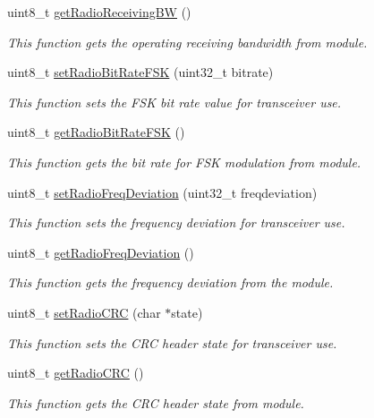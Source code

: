 \begin{DoxyCompactItemize}
uint8\+\_\+t \hyperlink{class_wasp_lo_ra_w_a_n_ada44238eb38e54b057f6659e7fc93c57}{get\+Radio\+Receiving\+BW} ()
\begin{DoxyCompactList}\small\item\em This function gets the operating receiving bandwidth from module. \end{DoxyCompactList}\item 
uint8\+\_\+t \hyperlink{class_wasp_lo_ra_w_a_n_ace29a7ccd8c85ea98453a1d7e793a40a}{set\+Radio\+Bit\+Rate\+F\+SK} (uint32\+\_\+t bitrate)
\begin{DoxyCompactList}\small\item\em This function sets the F\+SK bit rate value for transceiver use. \end{DoxyCompactList}\item 
uint8\+\_\+t \hyperlink{class_wasp_lo_ra_w_a_n_a1c30c959e4d71286ed406b360cbae244}{get\+Radio\+Bit\+Rate\+F\+SK} ()
\begin{DoxyCompactList}\small\item\em This function gets the bit rate for F\+SK modulation from module. \end{DoxyCompactList}\item 
uint8\+\_\+t \hyperlink{class_wasp_lo_ra_w_a_n_a3b89f81185d512dfb17babe9622014b0}{set\+Radio\+Freq\+Deviation} (uint32\+\_\+t freqdeviation)
\begin{DoxyCompactList}\small\item\em This function sets the frequency deviation for transceiver use. \end{DoxyCompactList}\item 
uint8\+\_\+t \hyperlink{class_wasp_lo_ra_w_a_n_a2a5d3afe9d00116dfa7cb217ac6a2163}{get\+Radio\+Freq\+Deviation} ()
\begin{DoxyCompactList}\small\item\em This function gets the frequency deviation from the module. \end{DoxyCompactList}\item 
uint8\+\_\+t \hyperlink{class_wasp_lo_ra_w_a_n_a1da844661c3003c683823e3096c9d74e}{set\+Radio\+C\+RC} (char $\ast$state)
\begin{DoxyCompactList}\small\item\em This function sets the C\+RC header state for transceiver use. \end{DoxyCompactList}\item 
uint8\+\_\+t \hyperlink{class_wasp_lo_ra_w_a_n_a0fb7464a8a8cf6887a3559677b9be300}{get\+Radio\+C\+RC} ()
\begin{DoxyCompactList}\small\item\em This function gets the C\+RC header state from module. \end{DoxyCompactList}\item 

\end{DoxyCompactItemize}
